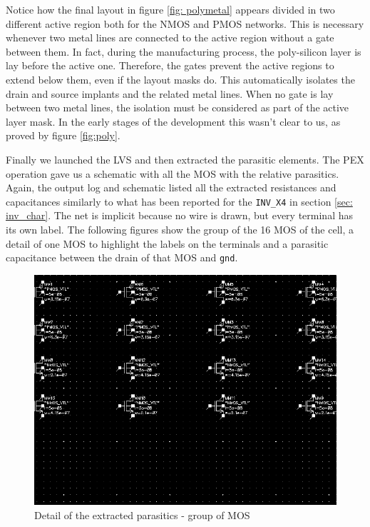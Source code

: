 \documentclass[a4paper]{article}
\newcommand{\inv}{\texttt{INV\_X4}\xspace}
\begin{document}
Notice how the final layout in figure \ref{fig: polymetal} appears divided in two different active region both for the NMOS and PMOS networks. This is necessary whenever two metal lines are connected to the active region without a gate between them. In fact, during the manufacturing process, the poly-silicon layer is lay before the active one. Therefore, the gates prevent the active regions to extend below them, even if the layout masks do. This automatically isolates the drain and source implants and the related metal lines. When no gate is lay between two metal lines, the isolation must be considered as part of the active layer mask. In the early stages of the development this wasn't clear to us, as proved by figure \ref{fig:poly}.

Finally we launched the LVS and then extracted the parasitic elements. The PEX operation gave us a schematic with all the MOS with the relative parasitics. Again, the output log and schematic listed all the extracted resistances and capacitances similarly to what has been reported for the \inv in section \ref{sec: inv_char}. The net is implicit because no wire is drawn, but every terminal has its own label. The following figures show the group of the 16 MOS of the cell, a detail of one MOS to highlight the labels on the terminals and a parasitic capacitance between the drain of that MOS and \texttt{gnd}.

\begin{figure}[H]
      \centering
       \includegraphics[width=12cm]{./Images/HA/HAX1_PEX.png}
\caption{Detail of the extracted parasitics - group of MOS}
\label{fig: PEX0}
\end{figure}
\end{document}
